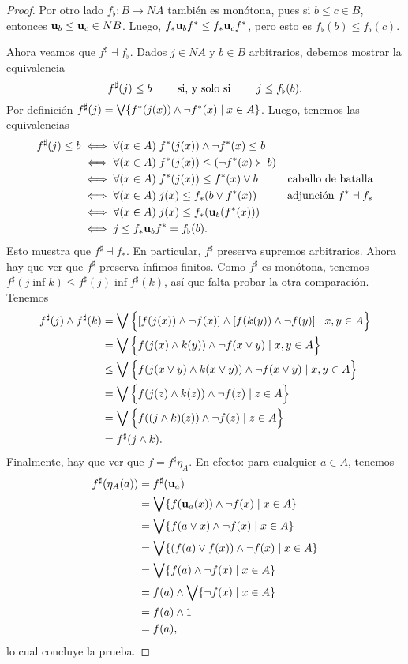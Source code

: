 \begin{proof}
  Por otro lado $f_\flat:B\to NA$ también es monótona,
  pues si $b\leq c\in B$, entonces $\mathbf u_{b}\leq\mathbf u_{c} \in NB$.
  Luego, $f_*\mathbf u_{b}f^*\leq f_*\mathbf u_{c}f^*$, pero
  esto es $f_\flat(b)\leq f_\flat(c)$.

  Ahora veamos que $f^\sharp \dashv f_\flat$.
  Dados $j\in NA$ y $b\in B$ arbitrarios, debemos mostrar la
  equivalencia
  \[
    f^\sharp(j)\leq b \qquad\text{ si, y solo si }\qquad j\leq f_\flat(b)
  .\]
  Por definición
  $f^\sharp(j)=\bigvee\{f^*(j(x))\wedge\neg f^*(x) \mid x\in A\}$.
  Luego, tenemos las equivalencias
  \begin{align*}
    f^\sharp(j) \leq b
    &\iff \forall(x\in A)\;f^*(j(x))\wedge\neg f^*(x)\leq b \\
    &\iff \forall(x\in A)\;f^*(j(x))\leq (\neg f^*(x)\succ b) \\
    &\iff \forall(x\in A)\;f^*(j(x)) \leq f^*(x)\vee b
      & \text{caballo de batalla} \\
    &\iff \forall(x\in A)\;j(x) \leq f_*(b\vee f^*(x))
      & \text{adjunción } f^*\dashv f_* \\
    &\iff \forall(x\in A)\;j(x) \leq f_*(\mathbf u_{b}(f^*(x))) \\
    &\iff j\leq f_*\mathbf u_{b} f^* = f_\flat(b).
  \end{align*}
  Esto muestra que $f^\sharp\dashv f_*$.
  En particular, $f^\sharp$ preserva supremos arbitrarios.
  Ahora hay que ver que $f^\sharp$ preserva ínfimos finitos.
  Como $f^\sharp$ es monótona, tenemos
  $f^\sharp(j\inf k)\leq f^\sharp(j)\inf f^\sharp(k)$,
  así que falta probar la otra comparación.
  Tenemos
  \begin{align*}
    f^\sharp(j)\wedge f^\sharp(k)
    &= \bigvee\Big\{[f(j(x))\wedge\neg f(x)]
        \wedge[f(k(y))\wedge\neg f(y)] \mid x,y\in A\Big\} \\
    &= \bigvee\Big\{f(j(x)\wedge k(y))\wedge\neg f(x\vee y)
        \mid x,y\in A\Big\} \\
    &\leq \bigvee\Big\{f(j(x\vee y)\wedge k(x\vee y))
        \wedge\neg f(x\vee y) \mid x,y\in A\Big\} \\
    &= \bigvee\Big\{f(j(z)\wedge k(z))
        \wedge\neg f(z) \mid z\in A\Big\} \\
    &= \bigvee\Big\{f((j\wedge k)(z))
        \wedge\neg f(z) \mid z\in A\Big\} \\
    &= f^\sharp(j\wedge k).
  \end{align*}
  Finalmente, hay que ver que $f=f^\sharp \eta_A$.
  En efecto: para cualquier $a\in A$, tenemos
  \begin{align*}
    f^\sharp(\eta_A(a))
    &= f^\sharp(\mathbf u_{a}) \\
    &= \bigvee\{f(\mathbf u_{a}(x))\wedge\neg f(x)\mid x\in A\} \\
    &= \bigvee\{f(a\vee x)\wedge\neg f(x)\mid x\in A\} \\
    &= \bigvee\{(f(a)\vee f(x))\wedge\neg f(x)\mid x\in A\} \\
    &= \bigvee\{f(a)\wedge\neg f(x)\mid x\in A\} \\
    &= f(a)\wedge\bigvee\{\neg f(x)\mid x\in A\} \\
    &= f(a)\wedge 1 \\
    &= f(a),
  \end{align*}
  lo cual concluye la prueba.
\end{proof}

